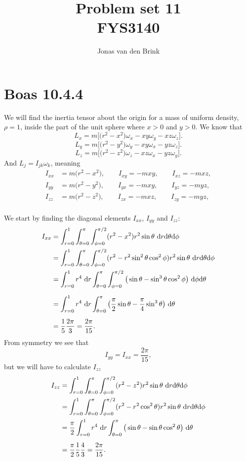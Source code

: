 \documentclass[a4paper, 11pt, titlepage, english]{article}
\author{Jonas van den Brink}
\title{Problem set 11 \\ FYS3140}
\renewcommand{\d}{{\rm d}}
\begin{document}
\maketitle
% 

\section*{Boas 10.4.4}
We will find the inertia tensor about the origin for a mass of uniform density, $\rho=1$, inside the part of the unit sphere where $x>0$ and $y>0$. We know that
$$ L_x = m\bigg[\big(r^2-x^2\big)\omega_x - xy\omega_y - xz\omega_z\bigg].$$
$$ L_y = m\bigg[\big(r^2-y^2\big)\omega_y - xy\omega_x - yz\omega_z\bigg].$$
$$ L_z = m\bigg[\big(r^2-z^2\big)\omega_z - xz\omega_x - yz\omega_y\bigg].$$
And $L_j = I_{jk}\omega_k$, meaning
\begin{align*}
I_{xx} &= m\big(r^2-x^2), \qquad I_{xy}=-mxy, \qquad I_{xz}=-mxz, \\
I_{yy} &= m\big(r^2-y^2), \qquad I_{yx}=-mxy, \qquad I_{yz}=-myz, \\
I_{zz} &= m\big(r^2-z^2), \qquad I_{zx}=-mxz, \qquad I_{zy}=-myz, \\
\end{align*}

We start by finding the diagonal elements $I_{xx}$, $I_{yy}$ and $I_{zz}$:
\begin{align*}
I_{xx} &=\int_{r=0}^1\int_{\theta=0}^{\pi}\int_{\phi=0}^{\pi/2} (r^2-x^2)r^2\sin\theta \ \d r \d \theta \d \phi \\
&=\int_{r=0}^1\int_{\theta=0}^{\pi}\int_{\phi=0}^{\pi/2} (r^2-r^2\sin^2\theta\cos^2\phi)r^2\sin\theta \ \d r \d \theta \d \phi \\
&=\int_{r=0}^1 r^4 \ \d r \int_{\theta=0}^{\pi} \int_{\phi=0}^{\pi/2}\big( \sin\theta -\sin^3\theta\cos^2\phi\big)    \ \d \phi\d \theta \\[0.2cm]
&=\int_{r=0}^1 r^4 \ \d r \int_{\theta=0}^{\pi}\big(\frac{\pi}{2}\sin\theta - \frac{\pi}{4}\sin^3\theta\big)    \ \d \theta \\[0.2cm]
&= \frac{1}{5}\frac{2\pi}{3} = \frac{2\pi}{15}.
\end{align*}
From symmetry we see that 
$$I_{yy} = I_{xx} = \frac{2\pi}{15},$$
but we will have to calculate $I_{zz}$
\begin{align*}
I_{zz} &=\int_{r=0}^1\int_{\theta=0}^{\pi}\int_{\phi=0}^{\pi/2} (r^2-z^2)r^2\sin\theta \ \d r \d \theta \d \phi \\
&=\int_{r=0}^1\int_{\theta=0}^{\pi}\int_{\phi=0}^{\pi/2} (r^2-r^2\cos^2\theta)r^2\sin\theta \ \d r \d \theta \d \phi \\
&=\frac{\pi}{2}\int_{r=0}^1 r^4 \ \d r \int_{\theta=0}^{\pi}\big( \sin\theta-\sin\theta\cos^2\theta\big) \ \d \theta \\[0.2cm]
&= \frac{\pi}{2}\frac{1}{5}\frac{4}{3} = \frac{2\pi}{15}.
\end{align*}
\end{document}
